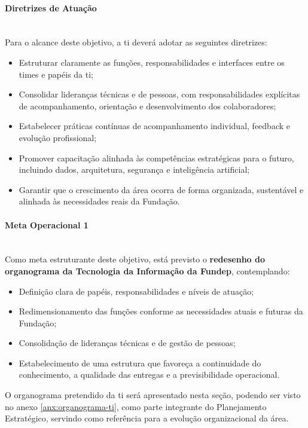 \documentclass[12pt,a4paper]{article}
\begin{document}
\paragraph{Diretrizes de Atuação}\mbox{}\\

Para o alcance deste objetivo, a \gls{ti} deverá adotar as seguintes diretrizes:

\begin{itemize}
  \item Estruturar claramente as funções, responsabilidades e interfaces entre os times e papéis da \gls{ti};
  \item Consolidar lideranças técnicas e de pessoas, com responsabilidades explícitas de acompanhamento, orientação e desenvolvimento dos colaboradores;
  \item Estabelecer práticas contínuas de acompanhamento individual, feedback e evolução profissional;
  \item Promover capacitação alinhada às competências estratégicas para o futuro, incluindo dados, arquitetura, segurança e inteligência artificial;
  \item Garantir que o crescimento da área ocorra de forma organizada, sustentável e alinhada às necessidades reais da Fundação.
\end{itemize}

\paragraph{Meta Operacional 1}\mbox{}\\

Como meta estruturante deste objetivo, está previsto o \textbf{redesenho do organograma da Tecnologia da Informação da Fundep}, contemplando:

\begin{itemize}
  \item Definição clara de papéis, responsabilidades e níveis de atuação;
  \item Redimensionamento das funções conforme as necessidades atuais e futuras da Fundação;
  \item Consolidação de lideranças técnicas e de gestão de pessoas;
  \item Estabelecimento de uma estrutura que favoreça a continuidade do conhecimento, a qualidade das entregas e a previsibilidade operacional.
\end{itemize}

O organograma pretendido da \gls{ti} será apresentado nesta seção, podendo ser visto no anexo \ref{anx:organograma-ti}, como parte integrante do Planejamento Estratégico, servindo como referência para a evolução organizacional da área.
\end{document}
